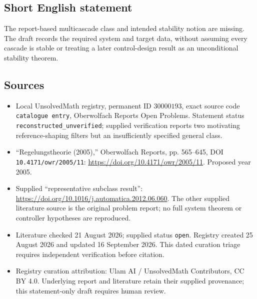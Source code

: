 \documentclass[11pt]{article}
\begin{document}
\subsection{Short English statement}
The report-based multicascade class and intended stability notion are missing. The draft records the required system and target data, without assuming every cascade is stable or treating a later control-design result as an unconditional stability theorem.
\subsection{Sources}
\begin{itemize}
\item Local UnsolvedMath registry, permanent ID \(30000193\), exact source code \texttt{catalogue entry}, Oberwolfach Reports Open Problems. Statement status \texttt{reconstructed\_unverified}; supplied verification reports two motivating reference-shaping filters but an insufficiently specified general class.
\item ``Regelungstheorie (2005),'' Oberwolfach Reports, pp. 565--645, DOI \texttt{10.4171/owr/2005/11}: \url{https://doi.org/10.4171/owr/2005/11}. Proposed year 2005.
\item Supplied ``representative subclass result'': \url{https://doi.org/10.1016/j.automatica.2012.06.060}. The other supplied literature source is the original problem report; no full system theorem or controller hypotheses are reproduced.
\item Literature checked 21 August 2026; supplied status \texttt{open}. Registry created 25 August 2026 and updated 16 September 2026. This dated curation triage requires independent verification before citation.
\item Registry curation attribution: Ulam AI / UnsolvedMath Contributors, CC BY 4.0. Underlying report and literature retain their supplied provenance; this statement-only draft requires human review.
\end{itemize}
\end{document}

